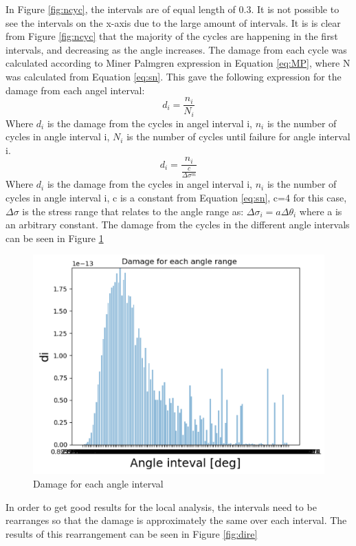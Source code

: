 \noindent In Figure \ref{fig:ncyc}, the intervals are of equal length of 0.3. It is not possible to see the intervals on the x-axis due to the large amount of intervals. It is is clear from Figure \ref{fig:ncyc} that the majority of the cycles are happening in the first intervals, and decreasing as the angle increases.\newline
\newline
The damage from each cycle was calculated according to Miner Palmgren expression in Equation \ref{eq:MP}, where N was calculated from Equation \ref{eq:sn}. This gave the following expression for the damage from each angel interval: 
\begin{equation}
    d_i  = \frac{n_i}{N_i}
\end{equation}
Where $d_i$ is the damage from the cycles in angel interval i, $n_i$ is the number of cycles in angle interval i, $N_i$ is the number of cycles until failure for angle interval i.
\begin{equation}
    d_i=\frac{n_i}{\frac{c}{\Delta \sigma ^m}}
\end{equation}
Where $d_i$ is the damage from the cycles in angel interval i, $n_i$ is the number of cycles in angle interval i, c is a constant from Equation \ref{eq:sn}, c=4 for this case, $\Delta \sigma$ is the stress range that relates to the angle range as: $\Delta \sigma_i = a \Delta \theta_i$ where a is an arbitrary constant.\newline
\newline 
The damage from the cycles in the different angle intervals can be seen in Figure \ref{fig:di}

\begin{figure}[H]
\centering
\includegraphics[scale=0.8]{figures/di}
\caption[Damage for each angle interval]{Damage for each angle interval}
 \label{fig:di}
\end{figure}
\noindent In order to get good results for the local analysis, the intervals need to be rearranges so that the damage is approximately the same over each interval. The results of this rearrangement can be seen in Figure \ref{fig:dire}

